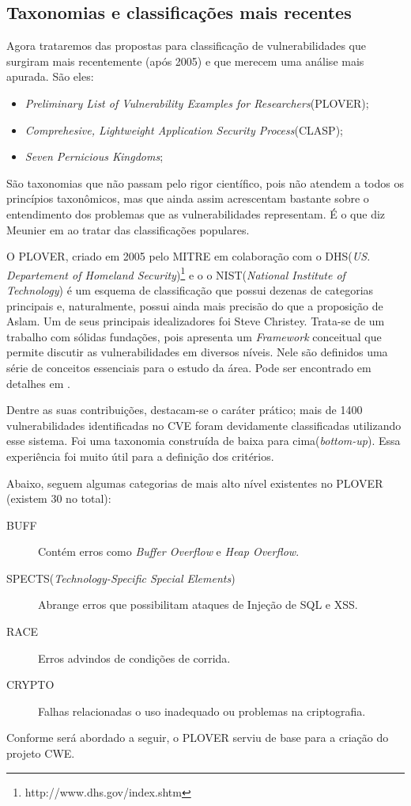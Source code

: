 		\subsection{Taxonomias e classificações mais recentes}
		\label{subsec:prop_taxonomicas_recentes}
			Agora trataremos das propostas para classificação de vulnerabilidades que surgiram
			mais recentemente (após 2005) e que merecem uma análise mais apurada. São eles:
			\begin{itemize}
				\item{\textsl{Preliminary List of Vulnerability Examples for Researchers}(PLOVER);}
				\item{\textsl{Comprehesive, Lightweight Application Security Process}(CLASP);}
				\item{\textsl{Seven Pernicious Kingdoms};}
			\end{itemize}
			São taxonomias que não passam pelo rigor científico, pois não atendem a todos
			os princípios taxonômicos, mas que ainda assim acrescentam bastante sobre o
			entendimento dos problemas que as vulnerabilidades representam. É o que
			diz Meunier em \cite{Meunier2006} ao tratar das classificações populares.


			O PLOVER, criado em 2005 pelo MITRE em colaboração com o 
			DHS(\textsl{US. Departement	of Homeland Security})\footnote{http://www.dhs.gov/index.shtm} e o
			o NIST(\textsl{National Institute of Technology}) é um esquema de classificação
			que possui dezenas de categorias principais e, naturalmente, possui ainda mais precisão
			do que a proposição de Aslam. Um de seus principais idealizadores foi Steve Christey.
			Trata-se de um trabalho com sólidas fundações, pois
			apresenta um \textsl{Framework} conceitual que permite discutir as vulnerabilidades
			em diversos níveis. Nele são definidos uma série de conceitos essenciais
			para o estudo da área. Pode ser encontrado em detalhes em \cite{Christey2006}.
			

			Dentre as suas contribuições, destacam-se o caráter prático; mais de 1400 vulnerabilidades
			identificadas no CVE foram devidamente classificadas utilizando esse sistema.
			Foi uma taxonomia construída de baixa para cima(\textsl{bottom-up}).
			Essa experiência foi muito útil para a definição dos critérios.


			Abaixo, seguem algumas categorias de mais alto nível existentes no PLOVER
			(existem 30 no total):
			\begin{description}
				\item[BUFF]{Contém erros como \textsl{Buffer Overflow} e \textsl{Heap Overflow}.}
				\item[SPECTS(\textsl{Technology-Specific Special Elements})]{Abrange erros que possibilitam
					ataques de Injeção de SQL e XSS.}
				\item[RACE]{Erros advindos de condições de corrida.}
				\item[CRYPTO]{Falhas relacionadas o uso inadequado ou problemas na criptografia.}
			\end{description}
			Conforme será abordado a seguir, o PLOVER serviu de base para a criação do projeto CWE.


